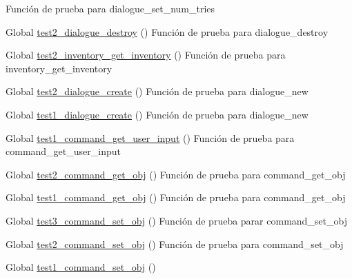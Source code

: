 \begin{DoxyRefList}
%
Función de prueba para dialogue\+\_\+set\+\_\+num\+\_\+tries  
\item[Global \mbox{\hyperlink{dialogue__test_8c_a99a74f2dbef5bee1740334e527f9503a}{test2\+\_\+dialogue\+\_\+destroy}} ()]\label{test__test000030}%
%
Función de prueba para dialogue\+\_\+destroy  
\item[Global \mbox{\hyperlink{inventory__test_8c_a800414ee6d964ee2424534f14a4dbda9}{test2\+\_\+inventory\+\_\+get\+\_\+inventory}} ()]\label{test__test000076}%
%
Función de prueba para inventory\+\_\+get\+\_\+inventory  
\item[Global \mbox{\hyperlink{dialogue__test_8c_ae8d40aea4149ebac0405882532e55cb0}{test2\+\_\+dialogue\+\_\+create}} ()]\label{test__test000028}%
%
Función de prueba para dialogue\+\_\+new  
\item[Global \mbox{\hyperlink{dialogue__test_8c_ade1598101fb1b7e43f97c43525fcd7db}{test1\+\_\+dialogue\+\_\+create}} ()]\label{test__test000027}%
%
Función de prueba para dialogue\+\_\+new  
\item[Global \mbox{\hyperlink{command__test_8c_a932afa8fb63c9b8ba551d030886ce491}{test1\+\_\+command\+\_\+get\+\_\+user\+\_\+input}} ()]\label{test__test000026}%
%
Función de prueba para command\+\_\+get\+\_\+user\+\_\+input  
\item[Global \mbox{\hyperlink{command__test_8c_a511e75b38aa6ada8e257a63358811f16}{test2\+\_\+command\+\_\+get\+\_\+obj}} ()]\label{test__test000025}%
%
Función de prueba para command\+\_\+get\+\_\+obj  
\item[Global \mbox{\hyperlink{command__test_8c_aadf3253367d2987d8aee88c1ab233288}{test1\+\_\+command\+\_\+get\+\_\+obj}} ()]\label{test__test000024}%
%
Función de prueba para command\+\_\+get\+\_\+obj  
\item[Global \mbox{\hyperlink{command__test_8c_abfd6a568c8ed93b7451d4ab0fa8ccb5d}{test3\+\_\+command\+\_\+set\+\_\+obj}} ()]\label{test__test000023}%
%
Función de prueba parar command\+\_\+set\+\_\+obj  
\item[Global \mbox{\hyperlink{command__test_8c_a1d4cc678d18ff7dc5b6db5efe591dd76}{test2\+\_\+command\+\_\+set\+\_\+obj}} ()]\label{test__test000022}%
%
Función de prueba para command\+\_\+set\+\_\+obj  
\item[Global \mbox{\hyperlink{command__test_8c_a7e688699618bf5315109bff122df83ff}{test1\+\_\+command\+\_\+set\+\_\+obj}} ()]\label{test__test000021}%

\end{DoxyRefList}
